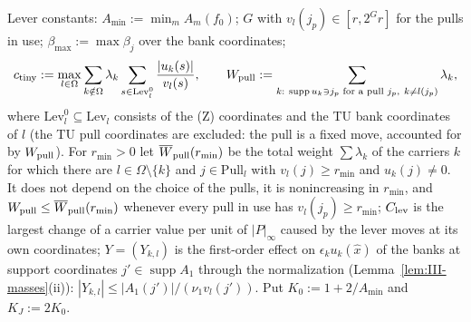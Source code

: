 \documentclass[10pt]{amsart}
\theoremstyle{definition}
\theoremstyle{remark}
\newcommand{\supp}{\operatorname{supp}}
\begin{document}
Lever constants: $A_{\min}:=\min_mA_m(f_0)$; $G$ with $v_l(j_p)\in[r,2^Gr]$ for
the pulls in use; $\beta_{\max}:=\max\beta_j$ over the bank coordinates;
\[
 c_{\rm tiny}:=\max_{l\in\Omega}\sum_{k\notin\Omega}\lambda_k\sum_{s\in
 \mathrm{Lev}^0_l}\frac{|u_k(s)|}{v_l(s)},\qquad
 W_{\rm pull}:=\sum_{k:\ \supp u_k\ni j_p\text{ for a pull }j_p,\ k\ne l(j_p)}
 \lambda_k ,
\]
where $\mathrm{Lev}^0_l\subseteq\mathrm{Lev}_l$ consists of the (Z) coordinates
and the TU bank coordinates of $l$ (the TU pull coordinates are excluded:
the pull is a fixed move, accounted for by $W_{\rm pull}$).  For $r_{\min}>0$
let $\overline W_{\rm pull}(r_{\min})$ be the total weight $\sum\lambda_k$ of
the carriers $k$ for which there are $l\in\Omega\setminus\{k\}$ and
$j\in\mathrm{Pull}_l$ with $v_l(j)\ge r_{\min}$ and $u_k(j)\ne0$.  It does not
depend on the choice of the pulls, it is nonincreasing in $r_{\min}$, and
$W_{\rm pull}\le\overline W_{\rm pull}(r_{\min})$ whenever every pull in use
has $v_l(j_p)\ge r_{\min}$;
$C_{\rm lev}$ is the largest change of a carrier value per unit of $|P|_\infty$
caused by the lever moves at its own coordinates; $Y=(Y_{k,l})$ is the
first-order effect on $\epsilon_ku_k(\hat x)$ of the banks at support
coordinates $j'\in\supp A_1$ through the normalization
(Lemma~\ref{lem:III-masses}(ii)): $|Y_{k,l}|\le|A_1(j')|/(\nu_1v_l(j'))$.
Put $K_0:=1+2/A_{\min}$ and $K_J:=2K_0$.
\end{document}
